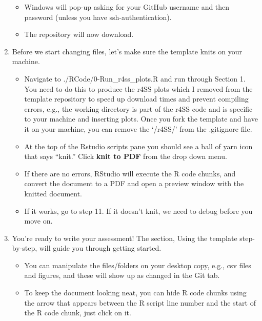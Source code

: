 \documentclass[12pt,]{article}
\providecommand{\tightlist}{%
  \setlength{\itemsep}{0pt}\setlength{\parskip}{0pt}}
\begin{document}
\begin{enumerate}
  \begin{itemize}
  \tightlist
  \item
    Windows will pop-up asking for your GitHub username and then
    password (unless you have ssh-authentication).
  \item
    The repository will now download.
  \end{itemize}
\item
  Before we start changing files, let's make sure the template knits on
  your machine.

  \begin{itemize}
  \tightlist
  \item
    Navigate to ./RCode/0-Run\_r4ss\_plots.R and run through Section 1.
    You need to do this to produce the r4SS plots which I removed from
    the template repository to speed up download times and prevent
    compiling errors, e.g., the working directory is part of the r4SS
    code and is specific to your machine and inserting plots. Once you
    fork the template and have it on your machine, you can remove the
    `/r4SS/' from the .gitignore file.
  \item
    At the top of the Rstudio scripts pane you should see a ball of yarn
    icon that says ``knit.'' Click \textbf{knit to PDF} from the drop
    down menu.
  \item
    If there are no errors, RStudio will execute the R code chunks, and
    convert the document to a PDF and open a preview window with the
    knitted document.
  \item
    If it works, go to step 11. If it doesn't knit, we need to debug
    before you move on.
  \end{itemize}
\item
  You're ready to write your assessment! The section, Using the template
  step-by-step, will guide you through getting started.

  \begin{itemize}
  \tightlist
  \item
    You can manipulate the files/folders on your desktop copy, e.g., csv
    files and figures, and these will show up as changed in the Git tab.
  \item
    To keep the document looking neat, you can hide R code chunks using
    the arrow that appears between the R script line number and the
    start of the R code chunk, just click on it.
  \end{itemize}
\end{enumerate}
\end{document}
